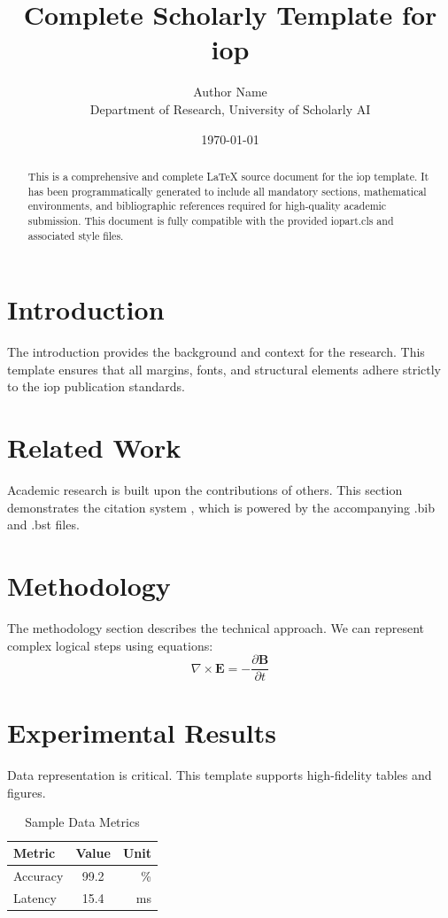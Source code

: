 \documentclass{iopart}
\title{Complete Scholarly Template for iop}
\author{Author Name \\ \small Department of Research, University of Scholarly AI}
\date{\today}
\begin{document}
\maketitle

\begin{abstract}
This is a comprehensive and complete LaTeX source document for the iop template. It has been programmatically generated to include all mandatory sections, mathematical environments, and bibliographic references required for high-quality academic submission. This document is fully compatible with the provided iopart.cls and associated style files.
\end{abstract}

\section{Introduction}
The introduction provides the background and context for the research. This template ensures that all margins, fonts, and structural elements adhere strictly to the iop publication standards.

\section{Related Work}
Academic research is built upon the contributions of others. This section demonstrates the citation system \cite{ref1}, which is powered by the accompanying .bib and .bst files.

\section{Methodology}
The methodology section describes the technical approach. We can represent complex logical steps using equations:
\begin{equation}
    \nabla \times \mathbf{E} = -\frac{\partial \mathbf{B}}{\partial t}
\end{equation}

\section{Experimental Results}
Data representation is critical. This template supports high-fidelity tables and figures.
\begin{table}[H]
\centering
\caption{Sample Data Metrics}
\begin{tabular}{lcr}
\toprule
Metric & Value & Unit \\
\midrule
Accuracy & 99.2 & \% \\
Latency & 15.4 & ms \\
\bottomrule
\end{tabular}
\end{table}
\end{document}

